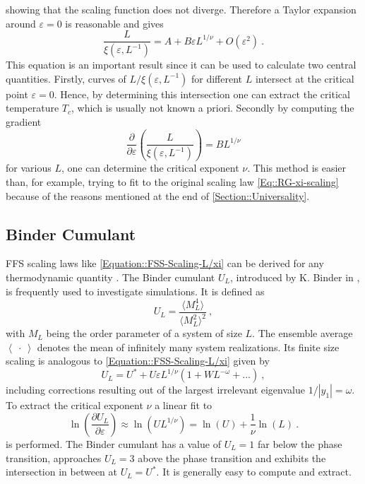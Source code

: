 	showing that the scaling function does not diverge. Therefore a Taylor expansion around $\varepsilon =	0$ is reasonable and gives
	\begin{equation} \label{Equation::FSS-Scaling-L/xi}
		\frac{L}{\xi(\varepsilon, L^{-1})} =	A + B \varepsilon L^{1/\nu} + O(\varepsilon^2)~. 
	\end{equation}
	This equation is an important result since it can be used to calculate two central quantities. Firstly, curves of $L/\xi(\varepsilon, L^{-1})$ for different $L$ intersect at the critical point $\varepsilon = 0$. Hence, by determining this intersection one can extract the critical temperature $T_c$, which is usually not known a priori. Secondly by computing the gradient
	\begin{equation}
		\frac{\partial}{\partial \varepsilon} \left(\frac{L}{\xi(\varepsilon, L^{-1})}\right) =	B L^{1/\nu}
	\end{equation}
	for various $L$, one can determine the critical exponent $\nu$. This method is easier than, for example, trying to fit to the original scaling law \autoref{Eq::RG-xi-scaling} because of the reasons mentioned at the end of \autoref{Section::Universality}.
	\subsection{Binder Cumulant} \label{Sec::Binder-Cumulant}
	FFS scaling laws like \autoref{Equation::FSS-Scaling-L/xi} can be derived for any thermodynamic quantity \cite{pelissetto2002critical, blote1995ising}. The Binder cumulant $U_L$, introduced by K. Binder in \cite{binder1981finite}, is frequently used to investigate simulations. It is defined as
	\begin{equation} \label{Eq::Def-Binder-Cum}
		U_L =	\frac{\langle M_L^4 \rangle}{\langle M_L^2 \rangle^2}~,
	\end{equation}
	with $M_L$ being the order parameter of a system of size $L$. The ensemble average $\left\langle~\cdot~\right \rangle$ denotes the mean of infinitely many system realizations. Its finite size scaling is analogous to \autoref{Equation::FSS-Scaling-L/xi} given by
	\begin{equation}
		U_L =	U^* + U \varepsilon L^{1/\nu} \left(1 + W L^{-\omega} + ...\right)~,
	\end{equation}
	including corrections resulting out of the largest irrelevant eigenvalue $1/|y_1| =	\omega $.
	To extract the critical exponent $\nu$ a linear fit to
	\begin{equation} \label{Eq::FSS-dU_dT}
		\ln \left(\frac{\partial U_L}{\partial \varepsilon}\right) \approx	\ln \left(U L^{1/\nu} \right) =	\ln (U) + \frac{1}{\nu} \ln (L) ~.
	\end{equation}
	is performed.
	The Binder cumulant has a value of $U_L=1$ far below the phase transition, approaches $U_L =	3$ above the phase transition and exhibits the intersection in between at $U_L =	U^*$. It is generally easy to compute and extract.
